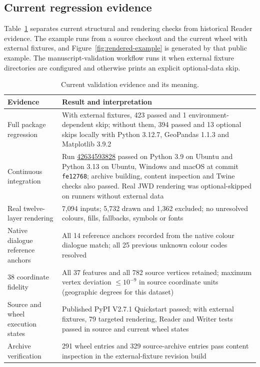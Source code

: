 \documentclass[preprint,12pt,numbers]{elsarticle}
\begin{document}
\subsection{Current regression evidence}

Table~\ref{tab:validation} separates current structural and rendering checks from historical Reader evidence. The example runs from a source checkout and the current wheel with external fixtures, and Figure~\ref{fig:rendered-example} is generated by that public example. The manuscript-validation workflow runs it when external fixture directories are configured and otherwise prints an explicit optional-data skip.

\begin{table}[htbp]
\centering
\caption{Current validation evidence and its meaning.}
\label{tab:validation}
\small
\begin{tabular}{p{}p{}}
\toprule
Evidence & Result and interpretation \\
\midrule
Full package regression & With external fixtures, 423 passed and 1 environment-dependent skip; without them, 394 passed and 13 optional skips locally with Python 3.12.7, GeoPandas 1.1.3 and Matplotlib 3.9.2 \\
Continuous integration & Run \href{https://github.com/leecugb/mapgis2shp/actions/runs/42634593828}{42634593828} passed on Python 3.9 on Ubuntu and Python 3.13 on Ubuntu, Windows and macOS at commit \texttt{fe12768}; archive building, content inspection and Twine checks also passed. Real JWD rendering was optional-skipped on runners without external data \\
Real twelve-layer rendering & 7{,}094 inputs; 5{,}732 drawn and 1{,}362 excluded; no unresolved colours, fills, fallbacks, symbols or fonts \\
Native dialogue reference anchors & All 14 reference anchors recorded from the native colour dialogue match; all 25 previous unknown colour codes resolved \\
38\textbar2 coordinate fidelity & All 37 features and all 782 source vertices retained; maximum vertex deviation $\leq 10^{-9}$ in source coordinate units (geographic degrees for this dataset) \\
Source and wheel execution states & Published PyPI V2.7.1 Quickstart passed; with external fixtures, 79 targeted rendering, Reader and Writer tests passed in source and current wheel states \\
Archive verification & 291 wheel entries and 329 source-archive entries pass content inspection in the external-fixture revision build \\
\bottomrule
\end{tabular}
\end{table}
\end{document}

